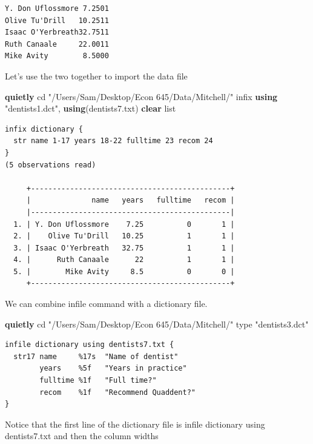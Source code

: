 \documentclass[
]{book}
\newenvironment{Shaded}{\begin{snugshade}}{\end{snugshade}}
\newcommand{\DecValTok}[1]{\textcolor[rgb]{0.00,0.00,0.81}{#1}}
\newcommand{\KeywordTok}[1]{\textcolor[rgb]{0.13,0.29,0.53}{\textbf{#1}}}
\newcommand{\NormalTok}[1]{#1}
\newcommand{\OtherTok}[1]{\textcolor[rgb]{0.56,0.35,0.01}{#1}}
\newcommand{\StringTok}[1]{\textcolor[rgb]{0.31,0.60,0.02}{#1}}
\begin{document}
\begin{verbatim}
Y. Don Uflossmore 7.2501
Olive Tu'Drill   10.2511
Isaac O'Yerbreath32.7511
Ruth Canaale     22.0011
Mike Avity        8.5000
\end{verbatim}

Let's use the two together to import the data file

\begin{Shaded}
\begin{Highlighting}[]
\KeywordTok{quietly}\NormalTok{ cd }\StringTok{"/Users/Sam/Desktop/Econ 645/Data/Mitchell/"}
\NormalTok{infix }\KeywordTok{using} \StringTok{"dentists1.dct"}\NormalTok{, }\KeywordTok{using}\NormalTok{(dentists7.txt) }\KeywordTok{clear}
\OtherTok{list}
\end{Highlighting}
\end{Shaded}

\begin{verbatim}
infix dictionary {
  str name 1-17 years 18-22 fulltime 23 recom 24
}
(5 observations read)

     +----------------------------------------------+
     |              name   years   fulltime   recom |
     |----------------------------------------------|
  1. | Y. Don Uflossmore    7.25          0       1 |
  2. |    Olive Tu'Drill   10.25          1       1 |
  3. | Isaac O'Yerbreath   32.75          1       1 |
  4. |      Ruth Canaale      22          1       1 |
  5. |        Mike Avity     8.5          0       0 |
     +----------------------------------------------+
\end{verbatim}

We can combine infile command with a dictionary file.

\begin{Shaded}
\begin{Highlighting}[]
\KeywordTok{quietly}\NormalTok{ cd }\StringTok{"/Users/Sam/Desktop/Econ 645/Data/Mitchell/"}
\DecValTok{type} \StringTok{"dentists3.dct"}
\end{Highlighting}
\end{Shaded}

\begin{verbatim}
infile dictionary using dentists7.txt {
  str17 name     %17s  "Name of dentist"
        years    %5f   "Years in practice"
        fulltime %1f   "Full time?"
        recom    %1f   "Recommend Quaddent?"
}
\end{verbatim}

Notice that the first line of the dictionary file is
infile dictionary using dentists7.txt and then the column widths
\end{document}
